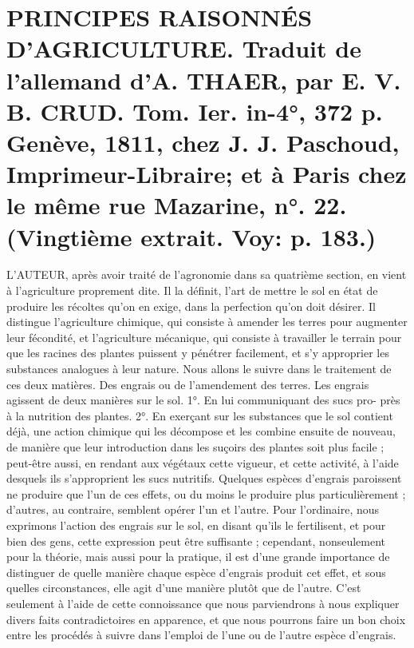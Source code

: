 \setcounter{page}{224}
\section{PRINCIPES RAISONNÉS D'AGRICULTURE. Traduit de l'allemand d'A. THAER, par E. V. B. CRUD. Tom. Ier. in-4°, 372 p. Genève, 1811, chez J. J. Paschoud, Imprimeur-Libraire; et à Paris chez le même rue Mazarine, n°. 22. \large{(Vingtième extrait. Voy: p. 183.)}}
L'AUTEUR, après avoir traité de l'agronomie dans sa quatrième section, en vient à l'agriculture proprement dite. Il la définit, l'art de mettre le sol en état de produire les récoltes qu'on en exige, dans la perfection qu'on doit désirer. Il distingue l'agriculture chimique, qui consiste à amender les terres pour augmenter leur fécondité, et l'agriculture mécanique, qui consiste à travailler le terrain pour que les racines des plantes puissent y pénétrer facilement, et s'y approprier les substances analogues à leur nature. Nous allons le suivre dans le traitement de ces deux matières.
Des engrais ou de l'amendement des terres.
Les engrais agissent de deux manières sur le sol.
1°. En lui communiquant des sucs pro-\setcounter{page}{225} près à la nutrition des plantes. 2°. En exerçant sur les substances que le sol contient déjà, une action chimique qui les décompose et les combine ensuite de nouveau, de manière que leur introduction dans les suçoirs des plantes soit plus facile ; peut-être aussi, en rendant aux végétaux cette vigueur, et cette activité, à l'aide desquels ils s'approprient les sucs nutritifs.
Quelques espèces d'engrais paroissent ne produire que l'un de ces effets, ou du moins le produire plus particulièrement ; d'autres, au contraire, semblent opérer l'un et l'autre.
Pour l'ordinaire, nous exprimons l'action des engrais sur le sol, en disant qu'ils le fertilisent, et pour bien des gens, cette expression peut être suffisante ; cependant, nonseulement pour la théorie, mais aussi pour la pratique, il est d'une grande importance de distinguer de quelle manière chaque espèce d'engrais produit cet effet, et sous quelles circonstances, elle agit d'une manière plutôt que de l'autre. C'est seulement à l'aide de cette connoissance que nous parviendrons à nous expliquer divers faits contradictoires en apparence, et que nous pourrons faire un bon choix entre les procédés à suivre dans l'emploi de l'une ou de l'autre espèce d'engrais.
